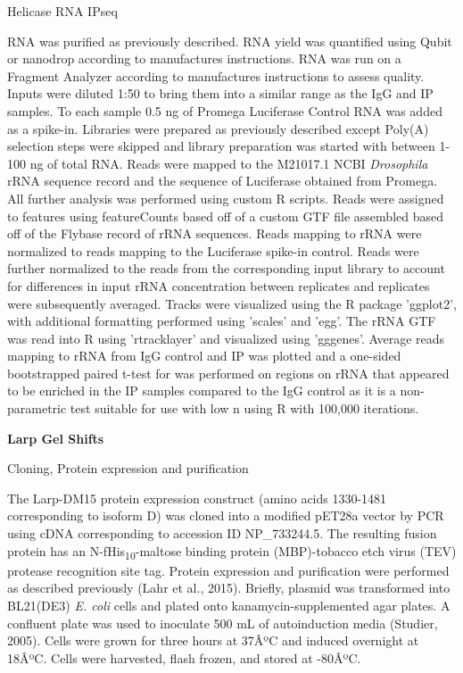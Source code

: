 \documentclass[12pt,twoside]{reedthesis}
\begin{document}
{Helicase RNA IPseq}

RNA was purified as previously described. RNA yield was quantified using
Qubit or nanodrop according to manufactures instructions. RNA was run on
a Fragment Analyzer according to manufactures instructions to assess
quality. Inputs were diluted 1:50 to bring them into a similar range as
the IgG and IP samples. To each sample 0.5 ng of Promega Luciferase
Control RNA was added as a spike-in. Libraries were prepared as
previously described except Poly(A) selection steps were skipped and
library preparation was started with between 1-100 ng of total RNA.
Reads were mapped to the M21017.1 NCBI \emph{Drosophila} rRNA sequence record
and the sequence of Luciferase obtained from Promega. All further
analysis was performed using custom R scripts. Reads were assigned to
features using featureCounts based off of a custom GTF file assembled
based off of the Flybase record of rRNA sequences. Reads mapping to rRNA
were normalized to reads mapping to the Luciferase spike-in control.
Reads were further normalized to the reads from the corresponding input
library to account for differences in input rRNA concentration between
replicates and replicates were subsequently averaged. Tracks were
visualized using the R package 'ggplot2', with additional formatting
performed using 'scales' and 'egg'. The rRNA GTF was read into R using
'rtracklayer' and visualized using 'gggenes'. Average reads mapping to
rRNA from IgG control and IP was plotted and a one-sided bootstrapped
paired t-test for was performed on regions on rRNA that appeared to be
enriched in the IP samples compared to the IgG control as it is a
non-parametric test suitable for use with low n using R with 100,000
iterations.

\textbf{Larp Gel Shifts}

{Cloning, Protein expression and purification}

The Larp-DM15 protein expression construct (amino acids 1330-1481
corresponding to isoform D) was cloned into a modified pET28a vector by
PCR using cDNA corresponding to accession ID NP\_733244.5. The resulting
fusion protein has an N-fHis\textsubscript{10}-maltose binding protein (MBP)-tobacco
etch virus (TEV) protease recognition site tag. Protein expression and
purification were performed as described previously
(Lahr et al., 2015). Briefly, plasmid was
transformed into BL21(DE3) \emph{E. coli} cells and plated onto
kanamycin-supplemented agar plates. A confluent plate was used to
inoculate 500 mL of autoinduction media
(Studier, 2005). Cells were grown for
three hours at 37ÂºC and induced overnight at 18ÂºC. Cells were harvested,
flash frozen, and stored at -80ÂºC.
\end{document}
